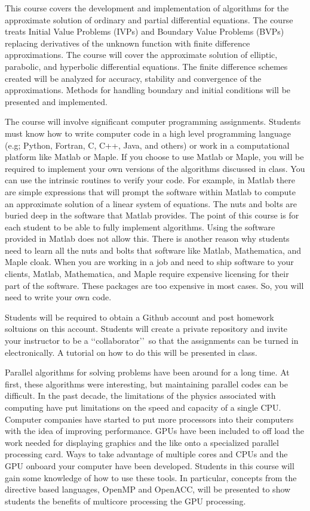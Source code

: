 \bigskip

This course covers the development and implementation of algorithms for the
approximate solution of ordinary and partial differential equations. The course
treats Initial Value Problems (IVPs) and Boundary Value Problems (BVPs)
replacing derivatives of the unknown function with finite difference
approximations. The course will cover the approximate solution of elliptic,
parabolic, and hyperbolic differential equations. The finite difference schemes
created will be analyzed for accuracy, stability and convergence of the
approximations. Methods for handling boundary and initial conditions will be
presented and implemented. 

The course will involve significant computer programming assignments. Students
must know how to write computer code in a high level programming language (e.g;
Python, Fortran, C, C++, Java, and others) or work in a computational platform
like Matlab or Maple. If you choose to use Matlab or Maple, you will be required
to implement your own versions of the algorithms discussed in class. You can use
the intrinsic routines to verify your code. For example, in Matlab there are
simple expressions that will prompt the software within Matlab to compute an
approximate solution of a linear system of equations. The nuts and bolts are
buried deep in the software that Matlab provides. The point of this course is
for each student to be able to fully implement algorithms. Using the software
provided in Matlab does not allow this. There is another reason why students
need to learn all the nuts and bolts that software like Matlab, Mathematica, and
Maple cloak. When you are working in a job and need to ship software to your
clients, Matlab, Mathematica, and Maple require expensive licensing for their
part of the software. These packages are too expensive in most cases. So, you
will need to write your own code. 

Students will be required to obtain a Github account and post homework soltuions
on this account. Students will create a private repository and invite your
instructor to be a \lq\lq collaborator\rq\rq\ so that the assignments can be
turned in electronically. A tutorial on how to do this will be presented in
class.

Parallel algorithms for solving problems have been around for a long time. At
first, these algorithms were interesting, but maintaining parallel codes can be
difficult. In the past decade, the limitations of the physics associated with
computing have put limitations on the speed and capacity of a single CPU.
Computer companies have started to put more processors into their computers with
the idea of improving performance. GPUs have been included to off load the work
needed for displaying graphics and the like onto a specialized parallel
processing card. Ways to take advantage of multiple cores and CPUs and the
GPU onboard your computer have been developed. Students in this course will
gain some knowledge of how to use these tools. In particular, concepts from
the directive based languages, OpenMP and OpenACC, will be presented to show
students the benefits of multicore processing the GPU processing.

